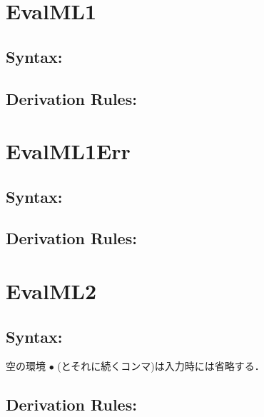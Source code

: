 \documentclass[11pt]{jarticle}
\begin{document}
\newpage

\section*{EvalML1}



\subsection*{Syntax:}

\EvalMLiDisplayBNF

\subsection*{Derivation Rules:}
\EvalMLiDisplayRules

\newpage

\section*{EvalML1Err}



\subsection*{Syntax:}

\EvalMLiErrDisplayBNF

\subsection*{Derivation Rules:}
\EvalMLiErrDisplayRules

\newpage

\section*{EvalML2}



\subsection*{Syntax:}

\EvalMLiiDisplayBNF

空の環境 \(\bullet\) (とそれに続くコンマ)は入力時には省略する．

\subsection*{Derivation Rules:}
\EvalMLiiDisplayRules
\end{document}
